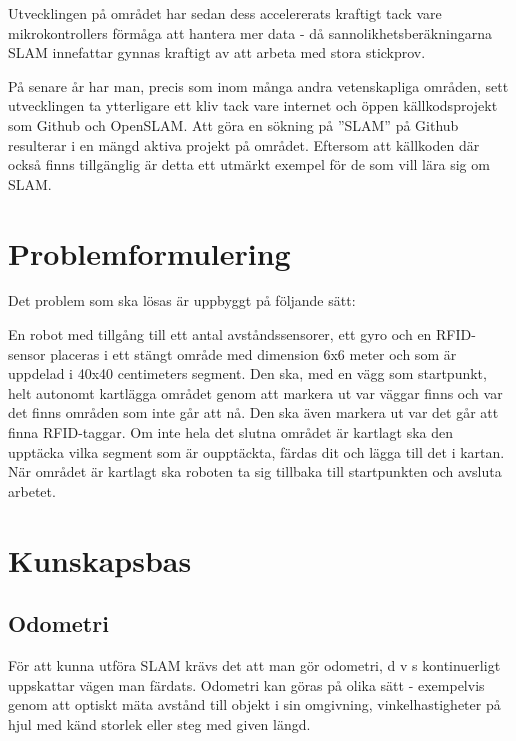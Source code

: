 \documentclass[a4paper,12pt,fleqn]{article}
\begin{document}
Utvecklingen på området har sedan dess accelererats kraftigt tack vare
mikrokontrollers förmåga att hantera mer data - då
sannolikhetsberäkningarna SLAM innefattar gynnas kraftigt av att arbeta
med stora stickprov.

På senare år har man, precis som inom många andra vetenskapliga områden, sett utvecklingen ta ytterligare ett kliv tack vare internet och öppen källkodsprojekt som Github och OpenSLAM. Att göra en sökning på ''SLAM'' på Github resulterar i en mängd aktiva projekt på området. Eftersom att källkoden där också finns tillgänglig är detta ett utmärkt exempel för de som vill lära sig om SLAM. 


\section{Problemformulering}

Det problem som ska lösas är uppbyggt på följande sätt:

En robot med tillgång till ett antal avståndssensorer, ett gyro och en RFID-sensor placeras i ett stängt område med dimension 6x6 meter och som är uppdelad i 40x40 centimeters segment. Den ska, med en vägg som startpunkt, helt autonomt kartlägga området genom att markera ut var väggar finns och var det finns områden som inte går att nå. Den ska även markera ut var det går att finna RFID-taggar. Om inte hela det slutna området är kartlagt ska den upptäcka vilka segment som är oupptäckta, färdas dit och lägga till det i kartan. När området är kartlagt ska roboten ta sig tillbaka till startpunkten och avsluta arbetet.

\section{Kunskapsbas}

\subsection{Odometri}

För att kunna utföra SLAM krävs det att man gör odometri, d v s kontinuerligt uppskattar vägen man färdats. Odometri kan göras på olika sätt - exempelvis genom att optiskt mäta avstånd till objekt i sin omgivning, vinkelhastigheter på hjul med känd storlek eller steg med given längd. 
\end{document}
